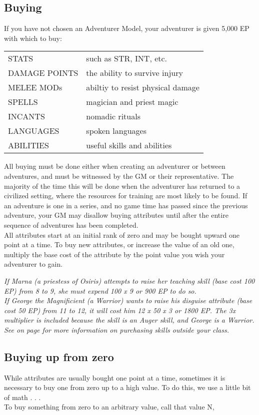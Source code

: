 \begin{multicols*}{2}
\section{Buying}
\label{create-buying}
If you have not chosen an Adventurer Model, your adventurer is given 5,000 EP with which to buy:

\begin{tabular}{@{}l l}
STATS & such as STR, INT, etc.\\
DAMAGE POINTS  & the ability to survive injury\\
MELEE MODs & abiltiy to resist physical damage\\
SPELLS & magician and priest magic\\
INCANTS & nomadic rituals\\
LANGUAGES & spoken languages\\
ABILITIES & useful skills and abilities\\
\end{tabular}

All buying must be done either when creating an adventurer or between adventures, and must be witnessed by the GM or their representative. The majority of the time this will be done when the adventurer has returned to a civilized setting, where the resources for training are most likely to be found. If an adventure is one in a series, and no game time has passed since the previous adventure, your GM may disallow buying attributes until after the entire sequence of adventures has been completed. \\
All attributes start at an initial rank of zero and may be bought upward one point at a time. To buy new attributes, or increase the value of an old one, multiply the base cost of the attribute by the point value you wish your adventurer to gain.

\textit{If Marna (a priestess of Osiris) attempts to raise her teaching skill (base cost 100 EP) from 8 to 9, she must expend 100 x 9 or 900 EP to do so.\\
If George the Magnificient (a Warrior) wants to raise his disguise attribute (base cost 50 EP) from 11 to 12, it will cost him 12 x 50 x 3 or 1800 EP. The 3x multiplier is included because the skill is an Auger skill, and George is a Warrior. See  on page \textbf{\pageref{create-skills}} for more information on purchasing skills outside your class.}
\subsection{Buying up from zero}
While attributes are usually bought one point at a time, sometimes it is necessary to buy one from zero up to a high value. To do this, we use a little bit of math . . .\\
To buy something from zero to an arbitrary value, call that value N,


\end{multicols*}
